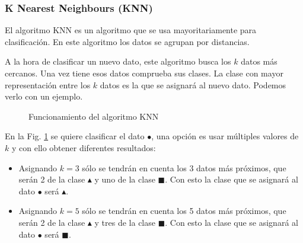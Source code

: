 \subsubsection{K Nearest Neighbours (KNN)}

El algoritmo KNN es un algoritmo que se usa mayoritariamente para clasificación. En este algoritmo los datos se agrupan por distancias.

A la hora de clasificar un nuevo dato, este algoritmo busca los $k$ datos más cercanos. Una vez tiene esos datos comprueba sus clases. La clase con mayor representación entre los $k$ datos es la que se asignará al nuevo dato. Podemos verlo con un ejemplo.

\begin{figure}[htpb!]
    \centering
    \caption{Funcionamiento del algoritmo KNN \cite{knnalgorithm2010}}
    \label{fig:knn_clasification}
\end{figure}

En la Fig. \ref{fig:knn_clasification} se quiere clasificar el dato \textcolor{verdedato}{\Large$\bullet$}, una opción es usar múltiples valores de $k$ y con ello obtener diferentes resultados:
\begin{itemize}
    \item Asignando $k = 3$ sólo se tendrán en cuenta los 3 datos más próximos, que serán 2 de la clase \textcolor{rojodato}{\large$\blacktriangle$} y uno de la clase \textcolor{azuldato}{$\blacksquare$}. Con esto la clase que se asignará al dato \textcolor{verdedato}{\Large$\bullet$} será \textcolor{rojodato}{\large$\blacktriangle$}.
    \item Asignando $k = 5$ sólo se tendrán en cuenta los 5 datos más próximos, que serán 2 de la clase \textcolor{rojodato}{\large$\blacktriangle$} y tres de la clase \textcolor{azuldato}{$\blacksquare$}. Con esto la clase que se asignará al dato \textcolor{verdedato}{\Large$\bullet$} será \textcolor{azuldato}{$\blacksquare$}.
\end{itemize}


